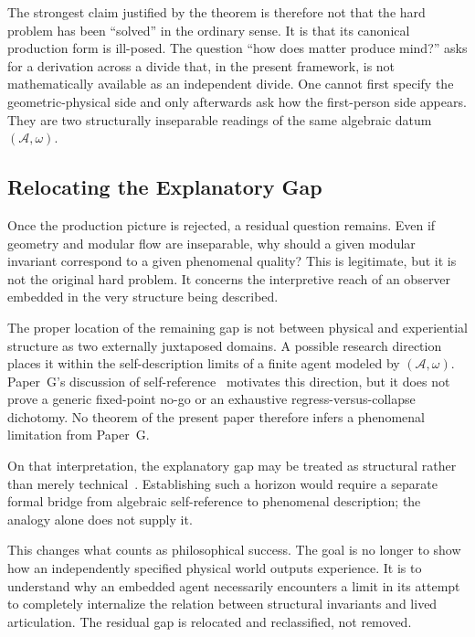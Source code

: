 \documentclass[12pt]{article}
\theoremstyle{definition}
\theoremstyle{remark}
\begin{document}
The strongest claim justified by the theorem is therefore not that the
hard problem has been ``solved'' in the ordinary sense. It is that its
canonical production form is ill-posed. The question ``how does matter
produce mind?'' asks for a derivation across a divide that, in the
present framework, is not mathematically available as an independent
divide. One cannot first specify the geometric-physical side and only
afterwards ask how the first-person side appears. They are two
structurally inseparable readings of the same algebraic datum
\((\mathcal{A},\omega)\).

\subsection{Relocating the Explanatory
Gap}\label{relocating-the-explanatory-gap}

Once the production picture is rejected, a residual question remains.
Even if geometry and modular flow are inseparable, why should a given
modular invariant correspond to a given phenomenal quality? This is
legitimate, but it is not the original hard problem. It concerns the
interpretive reach of an observer embedded in the very structure being
described.

The proper location of the remaining gap is not between physical and
experiential structure as two externally juxtaposed domains. A possible
research direction places it within the self-description limits of a
finite agent modeled by \((\mathcal{A},\omega)\). Paper~G's discussion of
self-reference~\cite{Liu2026PaperG} motivates this direction, but it does
not prove a generic fixed-point no-go or an exhaustive
regress-versus-collapse dichotomy. No theorem of the present paper
therefore infers a phenomenal limitation from Paper~G.

On that interpretation, the explanatory gap may be treated as structural
rather than merely technical~\cite{Levine1983}. Establishing such a
horizon would require a separate formal bridge from algebraic
self-reference to phenomenal description; the analogy alone does not
supply it.

This changes what counts as philosophical success. The goal is no longer
to show how an independently specified physical world outputs
experience. It is to understand why an embedded agent necessarily
encounters a limit in its attempt to completely internalize the relation
between structural invariants and lived articulation. The residual gap
is relocated and reclassified, not removed.
\end{document}
